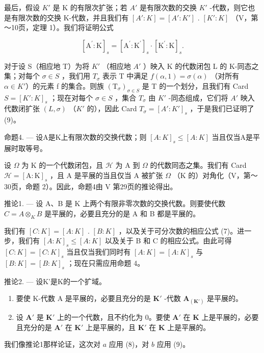 最后，假设 \(K'\) 是 K 的有限次扩张；若 \(A'\) 是有限次数的交换 \(K'\) -代数，则它也是有限次数的交换 K-代数，并且我们有 \([A':K] = [A':K']\) . \([K':K]\) （V，第～10页，定理 1）。我们将证明公式

\[
[ \mathrm{A} ^ {\prime}: \mathrm{K} ] _ {s} = [ \mathrm{A} ^ {\prime}: \mathrm{K} ^ {\prime} ] _ {s} \cdot [ \mathrm{K} ^ {\prime}: \mathrm{K} ] _ {s}.\tag{9}
\]

对于设 S（相应地 T）为将 \(K'\) （相应地 \(A'\) ）映入 K 的代数闭包 L 的 K-同态之集；对每个 \(\sigma \in S\) ，我们用 \(T_{\sigma}\) 表示 T 中满足 \(f(\alpha, 1) = \sigma(\alpha)\) （对所有 \(\alpha \in K'\)）的元素 f 的集合。则族 \((\mathrm{T}_{\sigma})_{\sigma \in S}\) 是 T 的一个划分，且我们有 Card \(S = [K': K]_{s}\) ；现在对每个 \(\sigma \in S\) ，集合 \(T_{\sigma}\) 由 \(K'\) -同态组成，它们将 \(A'\) 映入代数闭扩张 \((L, \sigma)\) （\(K'\) 的），因此 Card \(T_{\sigma} = [A': K']_{s}\) ，于是我们已证明了 (9)。

命题4. --- 设A是K上有限次数的交换代数；则 \([A:K]_{s} \leqslant [A:K]\) 当且仅当A是平展时取等号。

设 \(\Omega\) 为 K 的一个代数闭包，且 \(\mathcal{H}\) 为 A 到 \(\Omega\) 的代数同态之集。我们有 Card \(\mathcal{H} = [\mathrm{A}:\mathrm{K}]_s\) ，且 A 是平展的当且仅当 A 被扩张 \(\Omega\) （K 的）对角化（V，第～30页，命题 2）。因此，命题4由 V 第29页的推论得出。

推论1. --- 设 A、B 是 K 上两个有限非零次数的交换代数。则要使代数 \(C = A \otimes_{K} B\) 是平展的，必要且充分的是 A 和 B 都是平展的。

我们有 \([C:K]=[A:K]\) . \([B:K]\) ，以及关于可分次数的相应公式 (7)。进一步，我们有 \([A:K]_{s}\leqslant[A:K]\) 以及关于 B 和 C 的相应公式。由此可得 \([C:K]=[C:K]_{s}\) 当且仅当我们同时有 \([A:K]=[A:K]_{s}\) 与 \([B:K]=[B:K]_{s}\) ；现在只需应用命题 4。

推论2. --- 设K'是K的一个扩域。

\begin{enumerate}
\def\labelenumi{\alph{enumi})}
\item
  要使 K-代数 A 是平展的，必要且充分的是 \(\mathbf{K}'\) -代数 \(\mathbf{A}_{(\mathbf{K}')}\) 是平展的。
\item
  设 \(\mathbf{A}'\) 是 \(\mathbf{K}'\) 上的一个代数，且不约化为 0。要使 \(\mathbf{A}'\) 在 \(\mathbf{K}\) 上是平展的，必要且充分的是 \(\mathbf{A}'\) 在 \(\mathbf{K}'\) 上是平展的，且 \(\mathbf{K}'\) 在 \(\mathbf{K}\) 上是平展的。
\end{enumerate}

我们像推论1那样论证，这次对 \(a\) 应用 (8)，对 \(b\) 应用 (9)。

